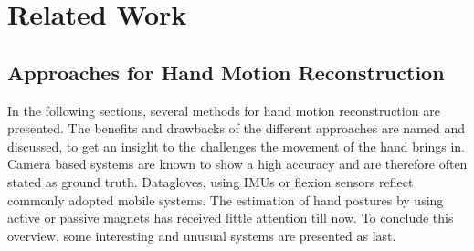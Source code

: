 
\lhead[\chaptername~\thechapter]{\rightmark}

\rhead[\leftmark]{}

\lfoot[\thepage]{}

\cfoot{}

\rfoot[]{\thepage}


\chapter{Related Work}
\label{cha:relatedWork}


\section{Approaches for Hand Motion Reconstruction} \label{sec:approaches}

In the following sections, several methods for hand motion reconstruction are presented. The benefits and drawbacks of the different approaches are named and discussed, to get an insight to the challenges the movement of the hand brings in. Camera based systems are known to show a high accuracy and are therefore often stated as ground truth. Datagloves, using \acp{IMU} or flexion sensors reflect commonly adopted mobile systems. The estimation of hand postures by using active or passive magnets has received little attention till now. To conclude this overview, some interesting and unusual systems are presented as last.

